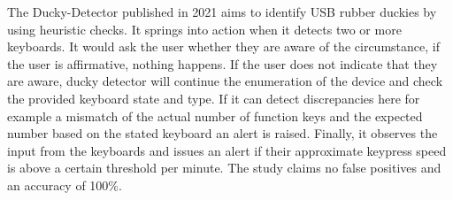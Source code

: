 The Ducky-Detector \cite{USBRubberDucky2021} published in 2021 aims to identify USB rubber duckies by using heuristic checks. It springs into action when it detects two or more keyboards. It would ask the user whether they are aware of the circumstance, if the user is affirmative, nothing happens. If the user does not indicate that they are aware, ducky detector will continue the enumeration of the device and check the provided keyboard state and type. If it can detect discrepancies here for example a mismatch of the actual number of function keys and the expected number based on the stated keyboard an alert is raised. Finally, it observes the input from the keyboards and issues an alert if their approximate keypress speed is above a certain threshold per minute. The study claims no false positives and an accuracy of 100\%. 


